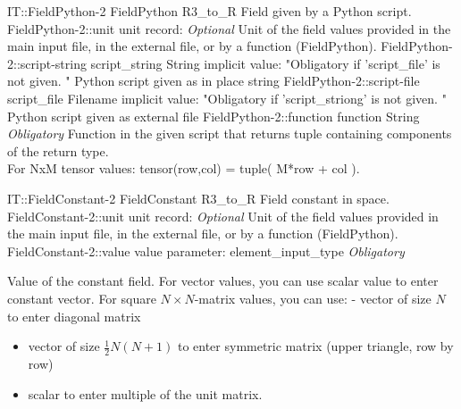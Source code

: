 \begin{RecordType}
	{IT::FieldPython-2}
	{FieldPython}
	{}%
	{}%
	{{{R3{\_}to{\_}R Field given by a Python script.}%
}}
		\RecKey
			{FieldPython-2::unit}
			{unit}
			{{record: }}{}
			{ \it{Optional}}
			{{{Unit of the field values provided in the main input file, in the external file, or by a function (FieldPython).}%
}}
		\RecKey
			{FieldPython-2::script-string}
			{script{\_}string}
			{{String}}{}
			{implicit value: "{Obligatory if 'script{\_}file' is not given. }"}
			{{{Python script given as in place string}%
}}
		\RecKey
			{FieldPython-2::script-file}
			{script{\_}file}
			{{Filename}}{}
			{implicit value: "{Obligatory if 'script{\_}striong' is not given. }"}
			{{{Python script given as external file}%
}}
		\RecKey
			{FieldPython-2::function}
			{function}
			{{String}}{}
			{ \it{Obligatory}}
			{{{Function in the given script that returns tuple containing components of the return type.}\\{
For NxM tensor values: tensor(row,col) = tuple( M*row + col ).}%
}}
\end{RecordType}
\begin{RecordType}
	{IT::FieldConstant-2}
	{FieldConstant}
	{}%
	{}%
	{{{R3{\_}to{\_}R Field constant in space.}%
}}
		\RecKey
			{FieldConstant-2::unit}
			{unit}
			{{record: }}{}
			{ \it{Optional}}
			{{{Unit of the field values provided in the main input file, in the external file, or by a function (FieldPython).}%
}}
		\RecKey
			{FieldConstant-2::value}
			{value}
			{{parameter: element{\_}input{\_}type}}{}
			{ \it{Obligatory}}
			{{{{Value of the constant field.
For vector values, you can use scalar value to enter constant vector.
For square }{$N\times N$}{-matrix values, you can use:  - vector of size }{$N$}{ to enter diagonal matrix}
% 
}
\begin{itemize}
\item {vector of size }{$\frac12N(N+1)$}{ to enter symmetric matrix (upper triangle, row by row)}
\item {scalar to enter multiple of the unit matrix.}
\end{itemize}
}}
\end{RecordType}
